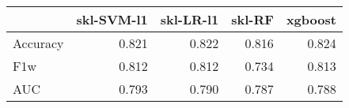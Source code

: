 \begin{tabular}{lrrrr}
\toprule
{} &  skl-SVM-l1 &  skl-LR-l1 &  skl-RF &  xgboost \\
\midrule
Accuracy &       0.821 &      0.822 &   0.816 &    0.824 \\
F1w      &       0.812 &      0.812 &   0.734 &    0.813 \\
AUC      &       0.793 &      0.790 &   0.787 &    0.788 \\
\bottomrule
\end{tabular}
